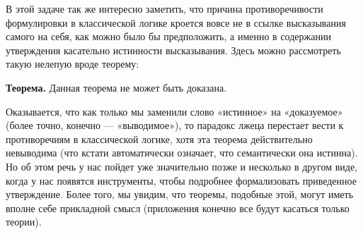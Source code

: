 В этой задаче так же интересно заметить, что причина противоречивости формулировки в классической логике кроется вовсе не в ссылке высказывания самого на себя, как можно было бы предположить, а именно в содержании утверждения касательно истинности высказывания. Здесь можно рассмотреть такую нелепую вроде теорему:

{\bfseries Теорема.} Данная теорема не может быть доказана.

Оказывается, что как только мы заменили слово «истинное» на «доказуемое» (более точно, конечно — «выводимое»), то парадокс лжеца перестает вести к противоречиям в классической логике, хотя эта теорема действительно невыводима (что кстати автоматически означает, что семантически она истинна). Но об этом речь у нас пойдет уже значительно позже и несколько в другом виде, когда у нас появятся инструменты, чтобы подробнее формализовать приведенное утверждение. Более того, мы увидим, что теоремы, подобные этой, могут иметь вполне себе прикладной смысл (приложения конечно все будут касаться только теории).

